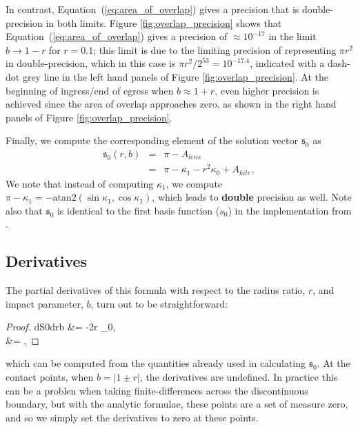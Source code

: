 \documentclass[modern,trackchanges]{aastex63}
\begin{document}
In contrast, Equation~(\ref{eq:area_of_overlap}) gives a precision
that is double-precision in both limits.  Figure
\ref{fig:overlap_precision} shows that Equation~(\ref{eq:area_of_overlap})
gives a precision of $\approx 10^{-17}$ in the limit $b \rightarrow
1-r$ for $r=0.1$; this limit is due to the limiting precision of
representing $\pi r^2$ in double-precision, which in this case
is $\pi r^2 / 2^{53} = 10^{-17.4}$, indicated with a dash-dot
grey line in the left hand panels of Figure \ref{fig:overlap_precision}.
At the beginning of ingress/end of egress when $b \approx 1+r$,
even higher precision is achieved since the area of overlap approaches
zero, as shown in the right hand panels of Figure \ref{fig:overlap_precision}.

Finally, we compute the corresponding element of the solution vector $\mathfrak{s}_0$
as
%
\begin{eqnarray} \label{eq:uniform}
    \label{eq:s0}
    \mathfrak{s}_0(r,b) &=& \pi-A_{lens}\nonumber\\
                        &=&\pi -\kappa_1 - r^2\kappa_0 + A_{kite},
\end{eqnarray}
%
We note that instead of computing $\kappa_1$,
we compute $\pi-\kappa_1 = -\mathrm{atan2}(\sin{\kappa_1},\cos{\kappa_1})$,
which leads to {\bf double} precision as well. Note also that $\mathfrak{s}_0$ is
identical to the first basis function ($s_0$) in the \starry implementation
from \citet{starry}.

\subsection{Derivatives}

The partial derivatives of this formula with respect to the radius
ratio, $r$, and impact parameter, $b$, turn out to be straightforward:
\begin{proof}{dS0drb}\label{eq:dS0_drb}
 &= -2r \kappa_0,\nonumber\\
 &= ,
\end{proof}
which can be computed from the quantities already used in calculating $\mathfrak{s}_0$.
At the contact points, when $b = \vert 1\pm r\vert$, the derivatives are undefined.
In practice this can be a problen when taking finite-differences across
the discontinuous boundary, but with the analytic formulae, these points
are a set of measure zero, and so we simply set the derivatives to zero
at these points.
\end{document}
